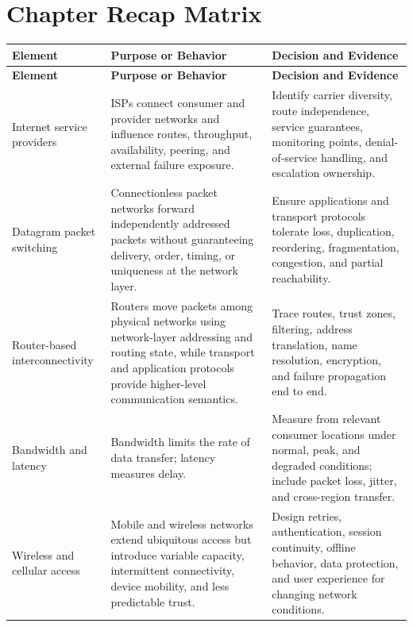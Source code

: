 \documentclass[11pt]{article}
\begin{document}
\section{Chapter Recap Matrix}
\begingroup\small\setlength{\tabcolsep}{4pt}
\begin{longtable}{@{}>{\RaggedRight\arraybackslash}p{}>{\RaggedRight\arraybackslash}p{}>{\RaggedRight\arraybackslash}p{}@{}}
\toprule\rowcolor{Navy}\color{white}\textbf{Element} & \color{white}\textbf{Purpose or Behavior} & \color{white}\textbf{Decision and Evidence}\\\midrule\endfirsthead
\toprule\rowcolor{Navy}\color{white}\textbf{Element} & \color{white}\textbf{Purpose or Behavior} & \color{white}\textbf{Decision and Evidence}\\\midrule\endhead
Internet service providers & ISPs connect consumer and provider networks and influence routes, throughput, availability, peering, and external failure exposure. & Identify carrier diversity, route independence, service guarantees, monitoring points, denial-of-service handling, and escalation ownership. \\\midrule
Datagram packet switching & Connectionless packet networks forward independently addressed packets without guaranteeing delivery, order, timing, or uniqueness at the network layer. & Ensure applications and transport protocols tolerate loss, duplication, reordering, fragmentation, congestion, and partial reachability. \\\midrule
Router-based interconnectivity & Routers move packets among physical networks using network-layer addressing and routing state, while transport and application protocols provide higher-level communication semantics. & Trace routes, trust zones, filtering, address translation, name resolution, encryption, and failure propagation end to end. \\\midrule
Bandwidth and latency & Bandwidth limits the rate of data transfer; latency measures delay. & Measure from relevant consumer locations under normal, peak, and degraded conditions; include packet loss, jitter, and cross-region transfer. \\\midrule
Wireless and cellular access & Mobile and wireless networks extend ubiquitous access but introduce variable capacity, intermittent connectivity, device mobility, and less predictable trust. & Design retries, authentication, session continuity, offline behavior, data protection, and user experience for changing network conditions. \\\midrule

\end{longtable}
\end{document}
